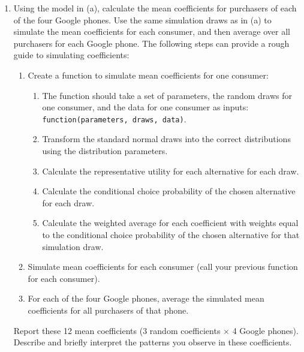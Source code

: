\documentclass[11pt,letterpaper]{article}\usepackage[]{graphicx}\usepackage[]{color}
\begin{document}
\begin{enumerate}[label=\alph*., leftmargin=*]
	\item Using the model in (a), calculate the mean coefficients for purchasers of each of the four Google phones. Use the same simulation draws as in (a) to simulate the mean coefficients for each consumer, and then average over all purchasers for each Google phone. The following steps can provide a rough guide to simulating coefficients:
	\begin{enumerate}[label=\Roman*.]
		\item Create a function to simulate mean coefficients for one consumer:
		\begin{enumerate}[label=\roman*.]
			\item The function should take a set of parameters, the random draws for one consumer, and the data for one consumer as inputs: \texttt{function(parameters, draws, data)}.
			\item Transform the standard normal draws into the correct distributions using the distribution parameters.
			\item Calculate the representative utility for each alternative for each draw.
			\item Calculate the conditional choice probability of the chosen alternative for each draw.
			\item Calculate the weighted average for each coefficient with weights equal to the conditional choice probability of the chosen alternative for that simulation draw.
		\end{enumerate}
		\item Simulate mean coefficients for each consumer (call your previous function for each consumer).
		\item For each of the four Google phones, average the simulated mean coefficients for all purchasers of that phone.
	\end{enumerate}
	Report these 12 mean coefficients (3 random coefficients $\times$ 4 Google phones). Describe and briefly interpret the patterns you observe in these coefficients.


\end{enumerate}
\end{document}
